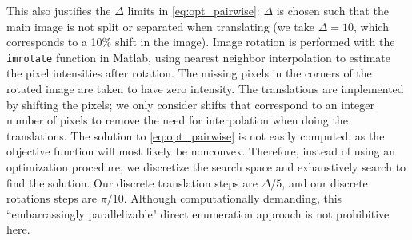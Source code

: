\documentclass{pnastwo}
\begin{document}
%
This also justifies the $\Delta$ limits in \eqref{eq:opt_pairwise}: $\Delta$ is chosen such that the main image is not split or separated when translating (we take $\Delta=10$, which corresponds to a 10\% shift in the image). 
%
Image rotation is performed with the \texttt{imrotate} function in Matlab, using nearest neighbor interpolation to estimate the pixel intensities after rotation.
%
The missing pixels in the corners of the rotated image are taken to have zero intensity.
%
The translations are implemented by shifting the pixels;
we only consider shifts that correspond to an integer number of pixels to remove the need for interpolation when doing the translations.
%
The solution to \eqref{eq:opt_pairwise} is not easily computed, as the objective function will most likely be nonconvex.
%
Therefore, instead of using an optimization procedure, we discretize the search space and exhaustively search to find the solution.
%
Our discrete translation steps are $\Delta/5$, and our discrete rotations steps are $\pi/10$. 
%
%
%
Although computationally demanding, this ``embarrassingly parallelizable" direct enumeration approach is not prohibitive here.
%
%
%

%
%
\end{document}
